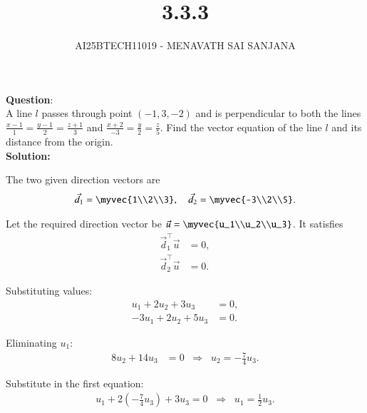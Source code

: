 \documentclass[journal]{IEEEtran}
\begin{document}

\vspace{3cm}

\title{3.3.3}
\author{AI25BTECH11019 - MENAVATH SAI SANJANA}
{\let\newpage\relax\maketitle}

\renewcommand{\thefigure}{\theenumi}
\renewcommand{\thetable}{\theenumi}
\setlength{\intextsep}{10pt} %

\renewcommand{\thetable}{\theenumi}

\textbf{Question}:\\
A line $l$ passes through point $(-1,3,-2)$ and is perpendicular to both the lines  
$\frac{x-1}{1} = \frac{y-1}{2} = \frac{z+1}{3}$ and  
$\frac{x+2}{-3} = \frac{y}{2} = \frac{z}{5}$. Find the vector equation of the line $l$ and its distance from the origin.
\\
\bigskip
\textbf{Solution: }

The two given direction vectors are
\begin{align}
\vec{d}_1 = \myvec{1\\2\\3}, \quad 
\vec{d}_2 = \myvec{-3\\2\\5}.
\end{align}

Let the required direction vector be $\vec{u} = \myvec{u_1\\u_2\\u_3}$.  
It satisfies
\begin{align}
\vec{d}_1^\top \vec{u} &= 0, \\
\vec{d}_2^\top \vec{u} &= 0.
\end{align}

Substituting values:
\begin{align}
u_1 + 2u_2 + 3u_3 &= 0, \\
-3u_1 + 2u_2 + 5u_3 &= 0.
\end{align}

Eliminating $u_1$:
\begin{align}
8u_2 + 14u_3 &= 0 \;\;\Rightarrow\;\; u_2 = -\frac{7}{4}u_3.
\end{align}

Substitute in the first equation:
\begin{align}
u_1 + 2\left(-\frac{7}{4}u_3\right) + 3u_3 = 0
\;\;\Rightarrow\;\; u_1 = \frac{1}{2}u_3.
\end{align}
\end{document}
